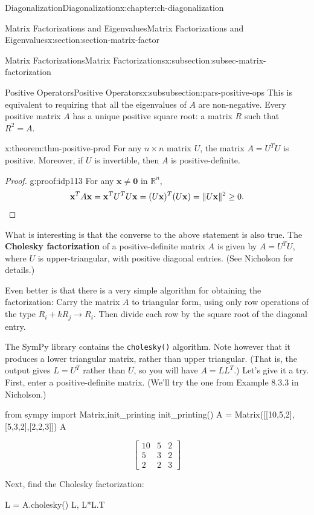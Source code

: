 \documentclass[oneside,10pt,]{book}
\newcommand{\mono}[1]{\texttt{#1}}
\newcommand{\terminology}[1]{\textbf{#1}}
\numberwithin{equation}{section}
\newcommand{\qedhere}{\relax}
\newcommand{\bbm}{\begin{bmatrix}}
\newcommand{\ebm}{\end{bmatrix}}
\newcommand{\R}{\mathbb{R}}
\newcommand{\len}[1]{\lVert #1\rVert}
\newcommand{\xx}{\mathbf{x}}
\newcommand{\zer}{\mathbf{0}}
\newcommand{\amp}{&}
\begin{document}
\begin{chapterptx}{Diagonalization}{}{Diagonalization}{}{}{x:chapter:ch-diagonalization}
\begin{sectionptx}{Matrix Factorizations and Eigenvalues}{}{Matrix Factorizations and Eigenvalues}{}{}{x:section:section-matrix-factor}
\begin{subsectionptx}{Matrix Factorizations}{}{Matrix Factorizations}{}{}{x:subsection:subsec-matrix-factorization}
\begin{subsubsectionptx}{Positive Operators}{}{Positive Operators}{}{}{x:subsubsection:pars-positive-ops}
This is equivalent to requiring that all the eigenvalues of \(A\) are non-negative. Every positive matrix \(A\) has a unique positive square root: a matrix \(R\) such that \(R^2=A\).%
\begin{theorem}{}{}{x:theorem:thm-positive-prod}%
For any \(n\times n\) matrix \(U\), the matrix \(A=U^TU\) is positive. Moreover, if \(U\) is invertible, then \(A\) is positive-definite.%
\end{theorem}
\begin{proof}{}{g:proof:idp113}
For any \(\xx\neq \zer\) in \(\R^n\),%
\begin{equation*}
\xx^T A\xx = \xx^TU^T U\xx = (U\xx)^T(U\xx) = \len{U\xx}^2\geq 0\text{.}\qedhere
\end{equation*}
%
\end{proof}
What is interesting is that the converse to the above statement is also true. The \terminology{Cholesky factorization} of a positive-definite matrix \(A\) is given by \(A=U^TU\), where \(U\) is upper-triangular, with positive diagonal entries. (See Nicholson for details.)%
\par
Even better is that there is a very simple algorithm for obtaining the factorization: Carry the matrix \(A\) to triangular form, using only row operations of the type \(R_i+kR_j\to R_i\). Then divide each row by the square root of the diagonal entry.%
\par
The SymPy library contains the \mono{cholesky()} algorithm. Note however that it produces a lower triangular matrix, rather than upper triangular. (That is, the output gives \(L=U^T\) rather than \(U\), so you will have \(A=LL^T\).) Let's give it a try. First, enter a positive-definite matrix. (We'll try the one from Example 8.3.3 in Nicholson.)%
\begin{sageinput}
from sympy import Matrix,init_printing
init_printing()
A = Matrix([[10,5,2],[5,3,2],[2,2,3]])
A
\end{sageinput}
\begin{sageoutput}
\[\bbm 10\amp 5\amp 2\\5\amp 3\amp 2\\2\amp 2\amp 3\ebm\]
\end{sageoutput}
Next, find the Cholesky factorization:%
\begin{sageinput}
L = A.cholesky()
L, L*L.T
\end{sageinput}
\begin{sageoutput}

\end{sageoutput}
\end{subsubsectionptx}
\end{subsectionptx}
\end{sectionptx}
\end{chapterptx}
\end{document}
